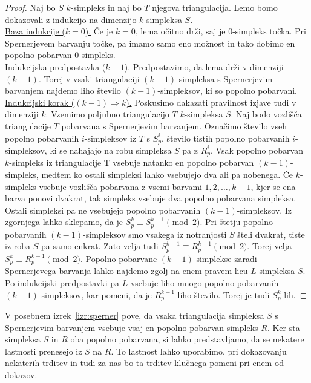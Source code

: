 \documentclass[mat1]{fmfdelo}
\newcommand{\0}{\underline{0}}
\begin{document}
\begin{proof}
Naj bo $S$ $k$-simpleks in naj bo $T$ njegova triangulacija. Lemo bomo dokazovali z indukcijo na dimenzijo $k$ simpleksa $S$. \\
\underline{Baza indukcije ($k = 0$).}
Če je $k=0$, lema očitno drži, saj je $0$-simpleks točka. Pri Spernerjevem barvanju točke, pa imamo samo eno možnost in tako dobimo en popolno pobarvan $0$-simpleks.\\
\underline{Indukcijska predpostavka ($k - 1$).}
Predpostavimo, da lema drži v dimenziji $(k - 1)$. Torej v vsaki triangulaciji $(k - 1)$-simpleksa s Spernerjevim barvanjem najdemo liho število $(k - 1)$-simpleksov, ki so popolno pobarvani. \\
\underline{Indukcijski korak ($(k - 1) \Longrightarrow k$).}
Poskusimo dakazati pravilnost izjave tudi v dimenziji $k$. Vzemimo poljubno triangulacijo $T$ $k$-simpleksa $S$. Naj bodo vozlišča triangulacije $T$ pobarvana s Spernerjevim barvanjem. Označimo število vseh popolno pobarvanih $i$-simpleksov iz $T$ s $S_p^i$, število tistih popolno pobarvanih $i$-simpleksov, ki se nahajajo na robu simpleksa $S$ pa z $R_p^i$. Vsak popolno pobarvan $k$-simpleks iz triangulacije T vsebuje natanko en popolno pobarvan $(k-1)$-simpleks, medtem ko ostali simpleksi lahko vsebujejo dva ali pa nobenega. Če $k$-simpleks vsebuje vozlišča pobarvana z vsemi barvami $1, 2, \dots, k-1$, kjer se ena barva ponovi dvakrat, tak simpleks vsebuje dva popolno pobarvana simpleksa. Ostali simpleksi pa ne vsebujejo popolno pobarvanih $(k - 1)$-simpleksov. Iz zgornjega lahko sklepamo, da je $S_p^k \equiv S_p^{k-1} \pmod 2$. Pri štetju popolno pobarvanih $(k - 1)$-simpleksov smo vsakega iz notranjosti $S$ šteli dvakrat, tiste iz roba $S$ pa samo enkrat. Zato velja tudi $S_p^{k-1} \equiv R_p^{k - 1} \pmod 2$. Torej velja $S_p^k \equiv R_p^{k - 1} \pmod 2$. Popolno pobarvane $(k - 1)$-simplekse zaradi Spernerjevega barvanja lahko najdemo zgolj na enem pravem licu $L$ simpleksa $S$. Po indukcijski predpostavki pa $L$ vsebuje liho mnogo popolno pobarvanih $(k - 1)$-simpleksov, kar pomeni, da je $R_p^{k - 1}$ liho število. Torej je tudi  $S_p^k$ lih.
\end{proof}
V posebnem izrek~\ref{izr:sperner} pove, da vsaka triangulacija simpleksa $S$ s Spernerjevim barvanjem vsebuje vsaj en popolno pobarvan simpleks $R$. Ker sta simpleksa $S$ in $R$ oba popolno pobarvana, si lahko predstavljamo, da se nekatere lastnosti prenesejo iz $S$ na $R$. To lastnost lahko uporabimo, pri dokazovanju nekaterih trditev in tudi za nas bo ta trditev klučnega pomeni pri enem od dokazov. 
\end{document}
